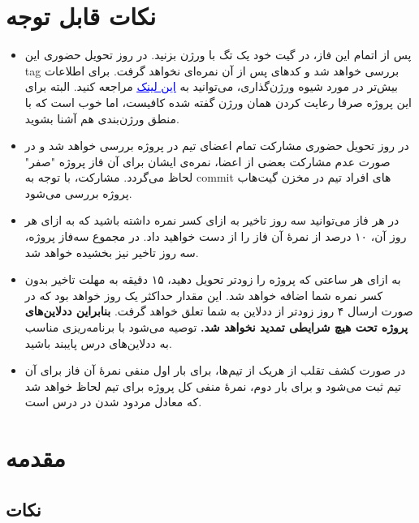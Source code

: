 \documentclass[]{article}
\begin{document}
\section*{{\titr نکات قابل توجه}}
\begin{itemize}
\item
پس از اتمام این فاز، در گیت خود یک تگ با ورژن  بزنید. در روز تحویل حضوری این tag بررسی خواهد شد و کدهای پس از آن نمره‌ای نخواهد گرفت. برای اطلاعات بیش‌تر در مورد شیوه ورژن‌گذاری، می‌توانید به
 \href{https://semver.org/}{\textcolor{blue}{\underline{این لینک}}}
 مراجعه کنید. البته برای این پروژه صرفا رعایت کردن همان ورژن گفته شده کافیست، اما خوب‌ است که با منطق ورژن‌بندی هم آشنا بشوید.

\item
در روز تحویل حضوری مشارکت تمام اعضای تیم در پروژه بررسی خواهد‌ شد و در صورت عدم مشارکت بعضی از اعضا، نمره‌ی ایشان برای آن فاز پروژه "صفر" لحاظ می‌گردد. مشارکت، با توجه به commit های افراد تیم در مخزن گیت‌هاب پروژه بررسی می‌شود.

\item
در هر فاز می‌توانید سه روز تاخیر به ازای کسر نمره داشته‌ باشید که به ازای هر روز آن، ۱۰ درصد از نمرهٔ آن فاز را از دست خواهید‌ داد. در مجموع سه‌فاز پروژه، سه روز تاخیر نیز بخشیده خواهد‌ شد.

\item
به ازای هر ساعتی که پروژه را زودتر تحویل دهید، ۱۵ دقیقه به مهلت تاخیر بدون کسر نمره شما اضافه خواهد‌ شد. این مقدار حداکثر یک روز خواهد‌ بود که در صورت ارسال ۴ روز زودتر از ددلاین به شما تعلق خواهد گرفت. \textbf{بنابراین ددلاین‌های پروژه تحت هیچ شرایطی تمدید نخواهد‌ شد.} توصیه می‌شود با برنامه‌ریزی مناسب به ددلاین‌های درس پایبند باشید.

\item
در صورت کشف تقلب از هریک از تیم‌ها، برای بار اول منفی نمرهٔ آن فاز برای آن تیم ثبت می‌شود و برای بار دوم، نمرهٔ منفی کل پروژه برای تیم لحاظ خواهد‌ شد که معادل مردود شدن در درس است.

\end{itemize}

\newpage

\section*{{\titr مقدمه}}

\subsection*{{\titr نکات}}
\end{document}
